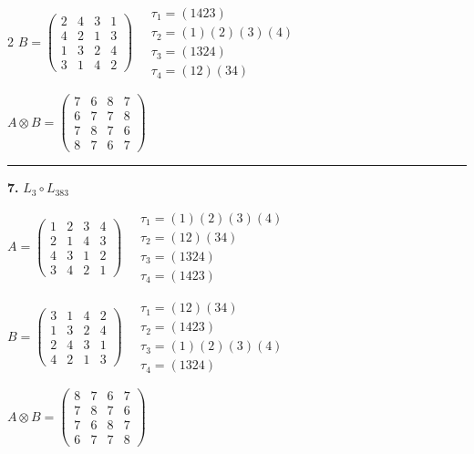\begin{multicols}{2}
$B = \begin{pmatrix} 2 & 4 & 3 & 1 \\ 4 & 2 & 1 & 3 \\ 1 & 3 & 2 & 4 \\ 3 & 1 & 4 & 2 \end{pmatrix} \quad \begin{matrix} \tau_{1}=(1 4 2 3) \\ \tau_{2}=(1)(2)(3)(4) \\ \tau_{3}=(1 3 2 4) \\ \tau_{4}=(1 2)(3 4) \end{matrix}$

$A \otimes B = \begin{pmatrix} 7 & 6 & 8 & 7 \\ 6 & 7 & 7 & 8 \\ 7 & 8 & 7 & 6 \\ 8 & 7 & 6 & 7 \end{pmatrix}$

\vspace{0.3em}
\hrule
\vspace{0.3em}

\noindent\textbf{7.} $L_{3} \circ L_{383}$

$A = \begin{pmatrix} 1 & 2 & 3 & 4 \\ 2 & 1 & 4 & 3 \\ 4 & 3 & 1 & 2 \\ 3 & 4 & 2 & 1 \end{pmatrix} \quad \begin{matrix} \tau_{1}=(1)(2)(3)(4) \\ \tau_{2}=(1 2)(3 4) \\ \tau_{3}=(1 3 2 4) \\ \tau_{4}=(1 4 2 3) \end{matrix}$

$B = \begin{pmatrix} 3 & 1 & 4 & 2 \\ 1 & 3 & 2 & 4 \\ 2 & 4 & 3 & 1 \\ 4 & 2 & 1 & 3 \end{pmatrix} \quad \begin{matrix} \tau_{1}=(1 2)(3 4) \\ \tau_{2}=(1 4 2 3) \\ \tau_{3}=(1)(2)(3)(4) \\ \tau_{4}=(1 3 2 4) \end{matrix}$

$A \otimes B = \begin{pmatrix} 8 & 7 & 6 & 7 \\ 7 & 8 & 7 & 6 \\ 7 & 6 & 8 & 7 \\ 6 & 7 & 7 & 8 \end{pmatrix}$


\end{multicols}
